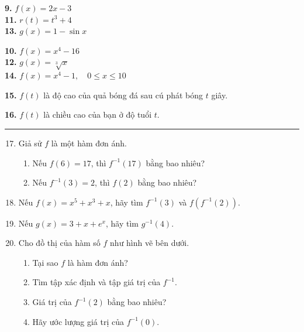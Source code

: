 \begin{minipage}[t]{0.485\textwidth}
\fontsize{8.2pt}{10.2pt}\selectfont
    \noindent
    \begin{minipage}[t]{0.48\linewidth}
        \textbf{9.} $f(x) = 2x - 3$\\[6pt]
        \textbf{11.} $r(t) = t^3 + 4$\\[6pt]
        \textbf{13.} $g(x) = 1 - \sin x$
    \end{minipage}\hfill
    \begin{minipage}[t]{0.48\linewidth}
        \textbf{10.} $f(x) = x^4 - 16$\\[6pt]
        \textbf{12.} $g(x) = \sqrt[3]{x}$\\[6pt]
        \textbf{14.} $f(x) = x^4 - 1, \quad 0 \le x \le 10$
    \end{minipage}

    \vspace{0.25em}
    \noindent
    \textbf{15.} $f(t)$ là độ cao của quả bóng đá sau cú phát bóng $t$ giây.

    \vspace{0.33em}
    \noindent
    \textbf{16.} $f(t)$ là chiều cao của bạn ở độ tuổi $t$.

    \vspace{0.41em}
    \noindent
    {\color{stewartcyan}\rule{\linewidth}{1pt}}
    \vspace{0.41em}

    \begin{enumerate}[label=\textbf{\arabic*.}, leftmargin=*, resume*]
        \setcounter{enumi}{16}
        \item Giả sử $f$ là một hàm đơn ánh.
        \begin{enumerate}[label=(\alph*), leftmargin=*]
            \item Nếu $f(6) = 17$, thì $f^{-1}(17)$ bằng bao nhiêu?
            \item Nếu $f^{-1}(3) = 2$, thì $f(2)$ bằng bao nhiêu?
        \end{enumerate}

        \item Nếu $f(x) = x^5 + x^3 + x$, hãy tìm $f^{-1}(3)$ và $f(f^{-1}(2))$.

        \item Nếu $g(x) = 3 + x + e^x$, hãy tìm $g^{-1}(4)$.

        \item Cho đồ thị của hàm số $f$ như hình vẽ bên dưới.
        \begin{enumerate}[label=(\alph*), leftmargin=*]
            \item Tại sao $f$ là hàm đơn ánh?
            \item Tìm tập xác định và tập giá trị của $f^{-1}$.
            \item Giá trị của $f^{-1}(2)$ bằng bao nhiêu?
            \item Hãy ước lượng giá trị của $f^{-1}(0)$.
        \end{enumerate}
    \end{enumerate}


\end{minipage}
